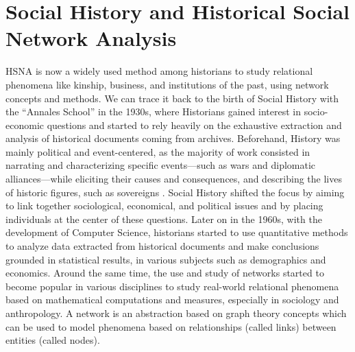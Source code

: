 \section{Social History and Historical Social Network Analysis}

HSNA is now a widely used method among historians to study relational phenomena like kinship, business, and institutions of the past, using network concepts and methods.
We can trace it back to the birth of Social History with the ``Annales School'' in the 1930s, where Historians gained interest in socio-economic questions and started to rely heavily on the exhaustive extraction and analysis of historical documents coming from archives\cite{blochApologiePourHistoire1949, prost2014}.
Beforehand, History was mainly political and event-centered, as the majority of work consisted in narrating and characterizing specific events---such as wars and diplomatic alliances---while eliciting their causes and consequences, and describing the lives of historic figures, such as sovereigns \cite{prost2014}.
Social History shifted the focus by aiming to link together sociological, economical, and political issues and by placing individuals at the center of these questions\cite{tilly1984retrieving}.
Later on in the 1960s, with the development of Computer Science, historians started to use quantitative methods to analyze data extracted from historical documents and make conclusions grounded in statistical results, in various subjects such as demographics\cite{henryRegistresParoissiauxHistoire1956} and economics\cite{goldinCliometricsNobel1995}.
Around the same time, the use and study of networks started to become popular in various disciplines to study real-world relational phenomena based on mathematical computations and measures, especially in sociology and anthropology.
A network is an abstraction based on graph theory concepts which can be used to model phenomena based on relationships (called links) between entities (called nodes).

